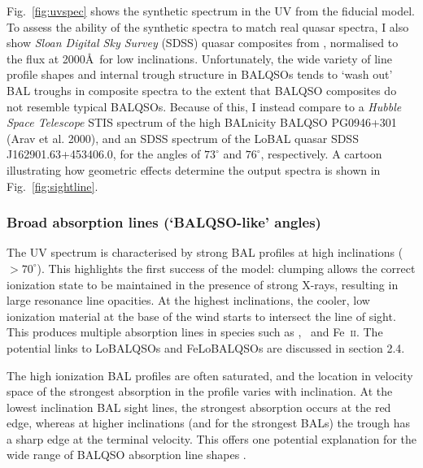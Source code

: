 \noindent
Fig.~\ref{fig:uvspec} shows the synthetic spectrum in the UV from the fiducial model. 
To assess the ability of the synthetic spectra to match real 
quasar spectra, I also show {\sl Sloan Digital Sky Survey} (SDSS) quasar
composites from \cite{reichard2003}, normalised to the flux at 2000\AA\
for low inclinations. Unfortunately, the wide variety of
line profile shapes and internal trough structure in BALQSOs
tends to `wash out' BAL troughs in composite spectra
to the extent that BALQSO composites do not resemble typical BALQSOs.
Because of this, I instead compare to a {\sl Hubble Space Telescope} 
STIS spectrum of the high BALnicity BALQSO PG0946+301 (Arav et al. 2000),
and an SDSS spectrum of the LoBAL quasar SDSS J162901.63+453406.0,
for the angles of $73^\circ$ and $76^\circ$, respectively. 
A cartoon illustrating how geometric effects determine
the output spectra is shown in Fig.~\ref{fig:sightline}.  

\subsubsection{Broad absorption lines (`BALQSO-like' angles)}
\label{sec:balqso_angles}

The UV spectrum is characterised by strong BAL 
profiles at high inclinations ($> 70^\circ$). 
This highlights the first success of the model: 
clumping allows the correct ionization state 
to be maintained in the presence of strong X-rays, 
resulting in large resonance line opacities. 
At the highest inclinations, the 
cooler, low ionization material at the base of the wind
starts to intersect the line of sight. This produces 
multiple absorption lines in species such as \mg,
\al\ and Fe~\textsc{ii}. The potential links to LoBALQSOs and 
FeLoBALQSOs are discussed in section 2.4.

The high ionization BAL profiles are often saturated, and the location in velocity space
of the strongest absorption in the profile varies with inclination.
At the lowest inclination BAL sight lines, the strongest absorption occurs at the red edge,
whereas at higher inclinations (and for the strongest BALs)
the trough has a sharp edge at the terminal velocity.
This offers one potential explanation for the wide range of BALQSO absorption
line shapes \citep[see e.g.][]{trump2006,knigge2008,filizak2014}.

